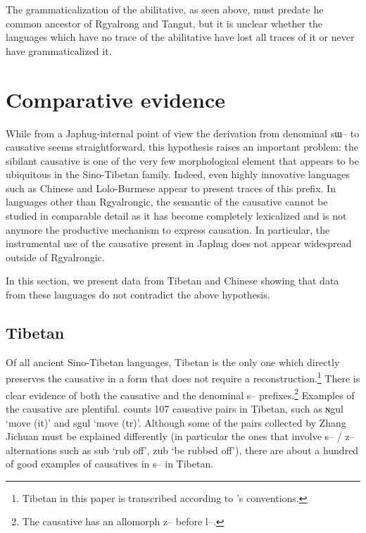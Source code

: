 \documentclass[oldfontcommands,oneside,a4paper,11pt]{article}
\newcommand{\ipa}[1]{{\phon \mbox{#1}}} %
\begin{document}
The grammaticalization of the abilitative, as seen above, must predate he common ancestor of Rgyalrong and Tangut, but it is unclear whether the languages which have no trace of the abilitative have lost all traces of it or never have grammaticalized it.

\section{Comparative evidence}

 While from a Japhug-internal point of view the derivation from denominal \ipa{sɯ--} to causative seems straightforward, this hypothesis raises an important problem:  the sibilant causative is one of the very few morphological element that appears to be ubiquitous in the Sino-Tibetan family. Indeed, even highly innovative languages such as Chinese and Lolo-Burmese appear to present  traces of this prefix. In languages other than Rgyalrongic, the semantic of the causative cannot be studied in comparable detail as it has become completely lexicalized and is not anymore the productive mechanism to express causation. In particular, the instrumental use of the causative present in Japhug does not appear widespread outside of Rgyalrongic.
 
 In this section, we present data from Tibetan and Chinese showing that data from these languages do not contradict the above hypothesis.

 
\subsection{Tibetan}

Of all ancient Sino-Tibetan languages, Tibetan is the only one which directly preserves the causative in a form that does not require a reconstruction.\footnote{Tibetan in this paper is transcribed according to \citet{jacques12transcription}'s conventions.} There is clear evidence of both the causative and the denominal \ipa{s--} prefixes.\footnote{The causative has an allomorph \ipa{z--} before \ipa{l--}.}  Examples of the causative are plentiful. \citet[210-8]{zhang09cizu} counts 107 causative pairs in Tibetan, such as \ipa{ɴgul} `move (it)' and \ipa{sgul} `move (tr)'. Although some of the pairs collected by Zhang Jichuan must be explained differently (in particular the ones that involve \ipa{s--} / \ipa{z--} alternations such as \ipa{sub} `rub off', \ipa{zub} `be rubbed off'), there are about a hundred of good examples of causatives in \ipa{s--} in Tibetan.
\end{document}
